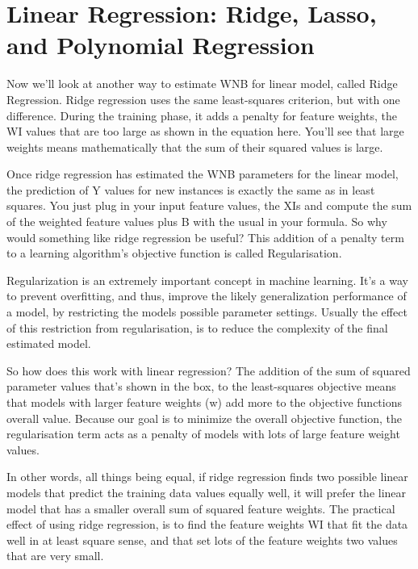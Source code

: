 \section{Linear Regression: Ridge, Lasso, and Polynomial Regression}
\begin{multicols}{2}

Now we'll look at another way to estimate WNB for linear model, called Ridge Regression. Ridge regression uses the same least-squares criterion, but with one difference. During the training phase, it adds a penalty for feature weights, the WI values that are too large as shown in the equation here. You'll see that large weights means mathematically that the sum of their squared values is large. 

Once ridge regression has estimated the WNB parameters for the linear model, the prediction of Y values for new instances is exactly the same as in least squares. You just plug in your input feature values, the XIs and compute the sum of the weighted feature values plus B with the usual in your formula. So why would something like ridge regression be useful? This addition of a penalty term to a learning algorithm's objective function is called Regularisation. 

Regularization is an extremely important concept in machine learning. It's a way to prevent overfitting, and thus, improve the likely generalization performance of a model, by restricting the models possible parameter settings. Usually the effect of this restriction from regularisation, is to reduce the complexity of the final estimated model. 

So how does this work with linear regression? The addition of the sum of squared parameter values that's shown in the box, to the least-squares objective means that models with larger feature weights (w) add more to the objective functions overall value. Because our goal is to minimize the overall objective function, the regularisation term acts as a penalty of models with lots of large feature weight values. 

In other words, all things being equal, if ridge regression finds two possible linear models that predict the training data values equally well, it will prefer the linear model that has a smaller overall sum of squared feature weights. The practical effect of using ridge regression, is to find the feature weights WI that fit the data well in at least square sense, and that set lots of the feature weights two values that are very small. 


\end{multicols}
